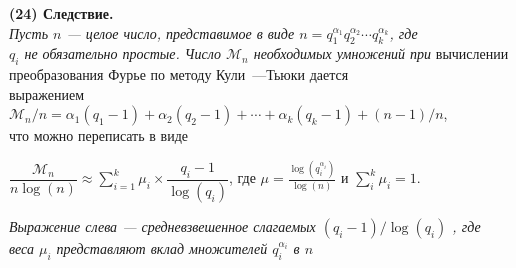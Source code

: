 \documentclass{mai_book}
\begin{document}
	\noindent\textbf{(24) Следствие.}\\
	\indent\textit{Пусть $n$ — целое число, представимое в виде $n= {q_1^{\alpha_1}}{q_2^{\alpha_2}}\cdots{q_k^{\alpha_k}}$, где \\ $q_i$ не обязательно простые. Число $\mathcal{M}_n$ необходимых умножений при}
		\newpage
\noindent вычислении преобразования Фурье по методу Кули~---Тьюки дается \\ выражением $\mathcal{M}_n/n = \alpha_1(q_1-1) + \alpha_2(q_2-1) +\cdots+\alpha_k(q_k-1) + (n-1)/n$,\\ что можно переписать в виде \\
\begin{center}
	$\dfrac{\mathcal{M}_n}{n\log(n)} \approx \sum\limits^k_{i=1} \mu_i\times\dfrac{q_i-1}{\log(q_i)}$, где $\mu = \frac{\log(q_i^{\alpha_i})}{\log(n)}$ и $\sum\limits_i^k \mu_i = 1$.\\
\end{center} 
\textit{Выражение слева — средневзвешенное слагаемых $(q_i-1)/\log(q_i)$ , где \\ веса $\mu_i$ представляют вклад множителей $q_i^{\alpha_i}$ в $n$}\\
\end{document}
